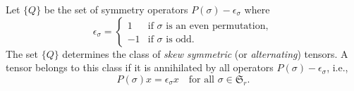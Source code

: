 Let $\{Q\}$ be the set of symmetry operators $P(\sigma) - \epsilon_\sigma$ where
$$\epsilon_\sigma = \begin{cases} 1 & \text{if } \sigma \text{ is an even permutation}, \\ -1 & \text{if } \sigma \text{ is odd}. \end{cases}$$
The set $\{Q\}$ determines the class of \textit{skew symmetric} (or \textit{alternating}) tensors. A tensor belongs to this class if it is annihilated by all operators $P(\sigma) - \epsilon_\sigma$, i.e.,
$$P(\sigma)x = \epsilon_\sigma x \quad \text{for all } \sigma \in \mathfrak{S}_r.$$
